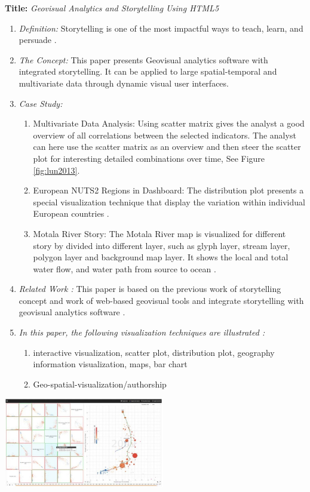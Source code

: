 \documentclass{egpubl}
\begin{document}
\textbf{Title:} \textit{Geovisual Analytics and Storytelling Using HTML5}
\begin{enumerate}
\item \textit{Definition:} Storytelling is one of the most impactful ways to teach, learn, and persuade \cite{lundblad2013}. 
\item \textit{The Concept:} This paper presents Geovisual analytics software with integrated storytelling. It can be applied to large spatial-temporal and multivariate data through dynamic visual user interfaces. 
\item  \textit{Case Study:} 
\begin{enumerate}
\item Multivariate Data Analysis: Using scatter matrix gives the analyst a good overview of all correlations between the selected
indicators. The analyst can here use the scatter matrix as an overview and then steer the scatter plot for interesting detailed combinations over time, See Figure \ref{fig:lun2013}\cite{lundblad2013}.
\item European NUTS2 Regions in Dashboard: The distribution plot presents a special visualization technique that display the variation within individual European countries \cite{lundblad2013}.
\item Motala River Story: The Motala River map is visualized for different story by divided into different layer, such as glyph layer, stream layer, polygon layer and background map layer. It shows the local and total water flow, and water path from source to ocean \cite{lundblad2013}.
\end{enumerate}
\item \textit{Related Work :} This paper is based on the previous work of storytelling concept and work of web-based geovisual tools and integrate storytelling with geovisual analytics software \cite{lundblad2013}.
\item \textit{In this paper, the following visualization techniques are illustrated :} 
\begin{enumerate}
\item interactive visualization, scatter plot, distribution plot, geography information visualization, maps, bar chart
\item Geo-spatial-visualization/authorship
\end{enumerate}
\end{enumerate}

\begingroup
\centering
\includegraphics[width=7cm]{./images/lun2013}
\label{fig:lun2013}
\endgroup
\end{document}
